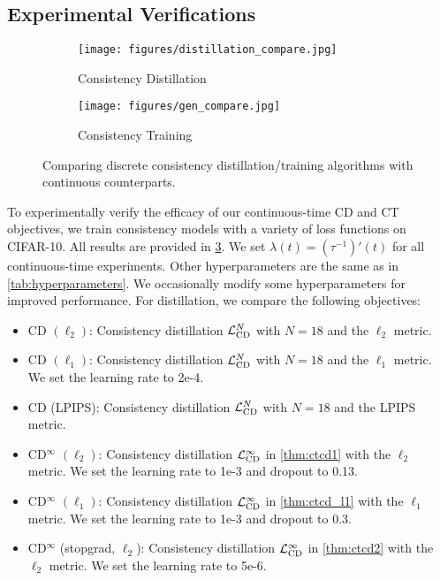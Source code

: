 \begin{appendices}
\subsection{Experimental Verifications}
\begin{figure}
    \centering
    \begin{subfigure}[b]{0.4\linewidth}
        \texttt{[image: figures/distillation\_compare.jpg]}
        \caption{Consistency Distillation}\label{fig:distillation_compare}
    \end{subfigure}
    \begin{subfigure}[b]{0.4\linewidth}
        \texttt{[image: figures/gen\_compare.jpg]}
        \caption{Consistency Training}\label{fig:gen_compare}
    \end{subfigure}
    \caption{Comparing discrete consistency distillation/training algorithms with continuous counterparts.}\label{fig:compare}
\end{figure}
To experimentally verify the efficacy of our continuous-time CD and CT objectives, we train consistency models with a variety of loss functions on CIFAR-10. All results are provided in \cref{fig:compare}. We set $\lambda(t) = (\tau^{-1})'(t)$ for all continuous-time experiments. Other hyperparameters are the same as in \cref{tab:hyperparameters}. We occasionally modify some hyperparameters for improved performance. For distillation, we compare the following objectives:
\begin{itemize}
    \item CD $(\ell_2)$: Consistency distillation $\mathcal{L}^{N}_\text{CD}$ with $N=18$ and the $\ell_2$ metric.
    \item CD $(\ell_1)$: Consistency distillation $\mathcal{L}^{N}_\text{CD}$ with $N=18$ and the $\ell_1$ metric. We set the learning rate to 2e-4.
    \item CD (LPIPS): Consistency distillation $\mathcal{L}^{N}_\text{CD}$ with $N=18$ and the LPIPS metric.
    \item CD$^\infty$ $(\ell_2)$: Consistency distillation $\mathcal{L}^\infty_\text{CD}$ in \cref{thm:ctcd1} with the $\ell_2$ metric. We set the learning rate to 1e-3 and dropout to 0.13.
    \item CD$^\infty$ $(\ell_1)$: Consistency distillation $\mathcal{L}^\infty_\text{CD}$ in \cref{thm:ctcd_l1} with the $\ell_1$ metric. We set the learning rate to 1e-3 and dropout to 0.3.
    \item CD$^\infty$ (stopgrad, $\ell_2$): Consistency distillation $\mathcal{L}^\infty_\text{CD}$ in \cref{thm:ctcd2} with the $\ell_2$ metric. We set the learning rate to 5e-6.

\end{itemize}
\end{appendices}
